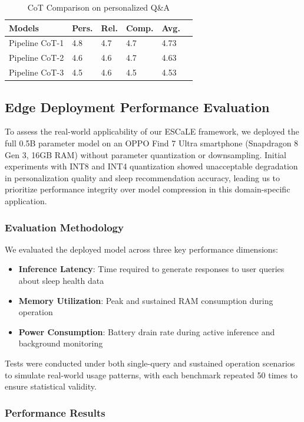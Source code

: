 \documentclass[preprint,12pt]{elsarticle}
\begin{document}
\begin{table}[H]
\centering
\caption{\label{tab:CoTs}CoT Comparison on personalized Q\&A}
\setlength{\tabcolsep}{2pt} %
\renewcommand{\arraystretch}{1.0} %
\begin{tabular}{l p{1.1cm} p{1.1cm} p{1.2cm} p{1.1cm} p{1.1cm}}
\toprule
Models & Pers. & Rel. & Comp. & \textbf{Avg.} \\
\midrule
 Pipeline CoT-1  & 4.8 & 4.7 & 4.7 & 4.73 \\
 Pipeline CoT-2 & 4.6 & 4.6 & 4.7 & 4.63 \\
 Pipeline CoT-3 & 4.5 & 4.6 & 4.5 & 4.53 \\
\bottomrule
\end{tabular}
\end{table}
\subsection{Edge Deployment Performance Evaluation}
To assess the real-world applicability of our ESCaLE framework, we deployed the full 0.5B parameter model on an OPPO Find 7 Ultra smartphone (Snapdragon 8 Gen 3, 16GB RAM) without parameter quantization or downsampling. Initial experiments with INT8 and INT4 quantization showed unacceptable degradation in personalization quality and sleep recommendation accuracy, leading us to prioritize performance integrity over model compression in this domain-specific application.
\subsubsection{Evaluation Methodology}
We evaluated the deployed model across three key performance dimensions:
\begin{itemize}
\item \textbf{Inference Latency}: Time required to generate responses to user queries about sleep health data
\item \textbf{Memory Utilization}: Peak and sustained RAM consumption during operation
\item \textbf{Power Consumption}: Battery drain rate during active inference and background monitoring
\end{itemize}

Tests were conducted under both single-query and sustained operation scenarios to simulate real-world usage patterns, with each benchmark repeated 50 times to ensure statistical validity.

\subsubsection{Performance Results}
\end{document}
